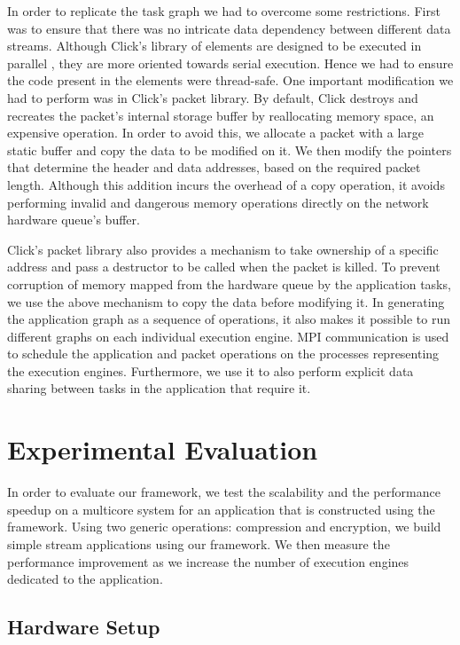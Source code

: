 \documentclass[conference]{IEEEtran}
\newcommand{\comment}[1]{}
\begin{document}
In order to replicate the task graph we had to overcome some restrictions. First was to ensure that there was no intricate data dependency between different data streams. Although Click's library of elements are designed to be executed in parallel \cite{Chen:2001:FCP:647055.759948}, they are more oriented towards serial execution. Hence we had to ensure the code present in the elements were thread-safe. One important modification we had to perform was in Click's packet library. By default, Click destroys and recreates the packet's internal storage buffer by reallocating memory space, an expensive operation. In order to avoid this, we allocate a packet with a large static buffer and copy the data to be modified on it. We then modify the pointers that determine the header and data addresses, based on the required packet length. \comment{This is done by using a simple sub-routine shown in Listing \ref{payload_sub} that we added to the packet library.} Although this addition incurs the overhead of a copy operation, it avoids performing invalid and dangerous memory operations directly on the network hardware queue's buffer.

Click's packet library also provides a mechanism to take ownership of a specific address and pass a destructor to be called when the packet is killed. To prevent corruption of memory mapped from the hardware queue by the application tasks, we use the above mechanism to copy the data before modifying it. In generating the application graph as a sequence of operations, it also makes it possible to run different graphs on each individual execution engine. MPI communication is used to schedule the application and packet operations on the processes representing the execution engines. Furthermore, we use it to also perform explicit data sharing between tasks in the application that require it.

\section{Experimental Evaluation}

In order to evaluate our framework, we test the scalability and the performance speedup on a multicore system for an application that is constructed using the framework. Using two generic operations: compression and encryption, we build simple stream applications using our framework. We then measure the performance improvement as we increase the number of execution engines dedicated to the application.

\subsection{Hardware Setup}
\end{document}

